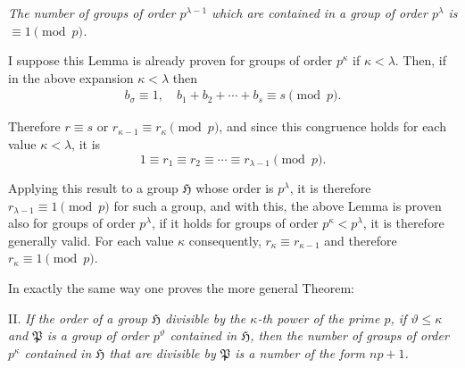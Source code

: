 \documentclass[a5paper,12pt]{article}
\newcommand{\secformat}[1]{\centering{\normalfont\normalsize{#1}}}
\let\fr\mathfrak
\newcommand{\CH}{\fr{H}}
\newcommand{\CP}{\fr{P}}
\newcommand{\?}{{\color{blue}${}^{(?)}$}}
\begin{document}

\emph{The number of groups of order $p^{\lambda-1}$
which are contained in a group of order $p^\lambda$
is $\equiv 1 \pmod{p}$.}


I suppose this Lemma is already proven
for groups of order $p^\kappa$ if $\kappa < \lambda$.
%
%
Then,
if in the above expansion $\kappa < \lambda$
then
\begin{align} \label{e:4-6} \tag{6.}
	b_\sigma \equiv 1,
	\quad
	b_1 + b_2 + \cdots + b_s \equiv s
	\pmod{p}.
\end{align}


Therefore $r \equiv s$ or $r_{\kappa-1} \equiv r_\kappa \pmod{p}$,
and since this congruence
holds for each value $\kappa < \lambda$,
it is
\[
	1 \equiv r_1 \equiv r_2 \equiv \cdots \equiv r_{\lambda-1}
	\pmod{p}
	.
\]


Applying this result 
to a group $\CH$
whose order is $p^\lambda$,
it is therefore
$r_{\lambda-1} \equiv 1 \pmod{p}$
for such a group,
and
with this,
the above Lemma is proven
also for groups of order $p^\lambda$,
if it holds
for groups of order $p^\kappa < p^\lambda$,
it is therefore generally valid.
%
%
For each value $\kappa$
consequently,
$r_\kappa \equiv r_{\kappa-1}$
and
therefore
$r_\kappa \equiv 1 \pmod{p}$.


In exactly the same way
one proves the more general Theorem:


II.
%
\label{t:4-2}
%
\emph{ %
If the order of a group $\CH$
divisible by the $\kappa$-th power
of the prime $p$,
if $\vartheta \leq \kappa$
and
$\CP$ is a group of order $p^\vartheta$
contained in $\CH$,
then
the number of groups of order $p^\kappa$
contained in $\CH$
that are divisible by $\CP$
is a number of the form $n p + 1$.
}



\subsubsection*{\secformat{\S.~5.}}
\end{document}
